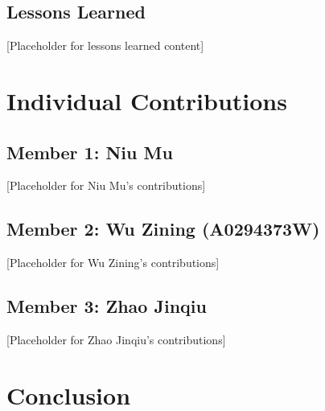 \documentclass[12pt,a4paper]{article}
\begin{document}
\subsection{Lessons Learned}


[Placeholder for lessons learned content]

\section{Individual Contributions}


\subsection{Member 1: Niu Mu}


[Placeholder for Niu Mu's contributions]

\subsection{Member 2: Wu Zining (A0294373W)}


[Placeholder for Wu Zining's contributions]

\subsection{Member 3: Zhao Jinqiu}


[Placeholder for Zhao Jinqiu's contributions]

\section{Conclusion}

\end{document}
